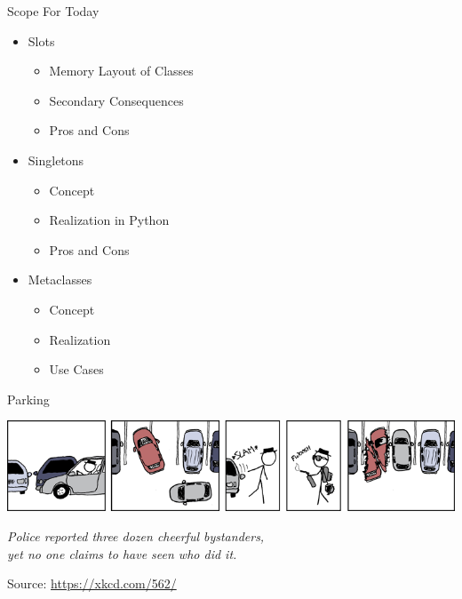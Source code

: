 
\begin{frame}[t,plain]
\titlepage
\end{frame}


\begin{frame}{Scope For Today}
%
\begin{itemize}
\item Slots
	\begin{itemize}
	\item Memory Layout of Classes
	\item Secondary Consequences
	\item Pros and Cons
	\end{itemize}
\item Singletons
	\begin{itemize}
	\item Concept
	\item Realization in Python
	\item Pros and Cons
	\end{itemize}
\item Metaclasses
	\begin{itemize}
	\item Concept
	\item Realization
	\item Use Cases
	\end{itemize}
\end{itemize}
%
\end{frame}


\begin{frame}{Parking}
%
\begin{center}
	\includegraphics[width=\linewidth]{./gfx/13-xkcd-parking}
\end{center}
%
\begin{center}
	\emph{Police reported three dozen cheerful bystanders,\\yet no one claims to have seen who did it.}

	\vspace{6pt}
	Source: \url{https://xkcd.com/562/}
\end{center}
%
\end{frame}

